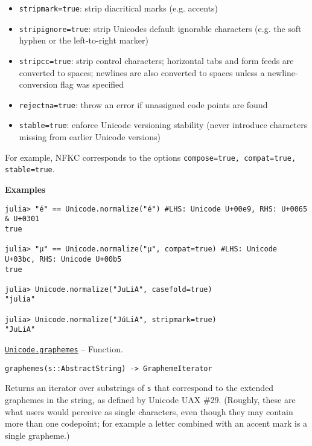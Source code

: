 \begin{adjustwidth}{2em}{0pt}
\begin{itemize}
\item \texttt{stripmark=true}: strip diacritical marks (e.g. accents)


\item \texttt{stripignore=true}: strip Unicode{\textquotesingle}s {\textquotedbl}default ignorable{\textquotedbl} characters (e.g. the soft hyphen or the left-to-right marker)


\item \texttt{stripcc=true}: strip control characters; horizontal tabs and form feeds are converted to spaces; newlines are also converted to spaces unless a newline-conversion flag was specified


\item \texttt{rejectna=true}: throw an error if unassigned code points are found


\item \texttt{stable=true}: enforce Unicode versioning stability (never introduce characters missing from earlier Unicode versions)

\end{itemize}
For example, NFKC corresponds to the options \texttt{compose=true, compat=true, stable=true}.

\textbf{Examples}


\begin{verbatim}
julia> "é" == Unicode.normalize("é") #LHS: Unicode U+00e9, RHS: U+0065 & U+0301
true

julia> "μ" == Unicode.normalize("µ", compat=true) #LHS: Unicode U+03bc, RHS: Unicode U+00b5
true

julia> Unicode.normalize("JuLiA", casefold=true)
"julia"

julia> Unicode.normalize("JúLiA", stripmark=true)
"JuLiA"
\end{verbatim}



\end{adjustwidth}
\hypertarget{15282403158595139101}{}
\hyperlink{15282403158595139101}{\texttt{Unicode.graphemes}}  -- {Function.}

\begin{adjustwidth}{2em}{0pt}


\begin{verbatim}
graphemes(s::AbstractString) -> GraphemeIterator
\end{verbatim}

Returns an iterator over substrings of \texttt{s} that correspond to the extended graphemes in the string, as defined by Unicode UAX \#29. (Roughly, these are what users would perceive as single characters, even though they may contain more than one codepoint; for example a letter combined with an accent mark is a single grapheme.)



\end{adjustwidth}
